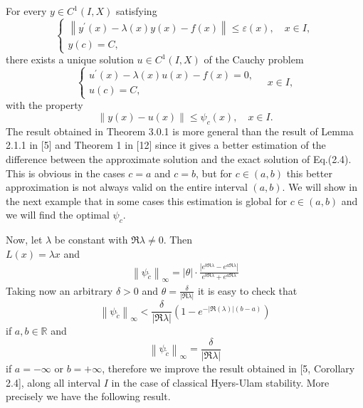 \documentclass[a4paper,12pt]{report}
\begin{document}
\begin{cor}
	 For every $y \in C^{1}(I, X)$ satisfying
	 $$ \left\{\begin{array}{l}
	 	\left\|y^{\prime}(x)-\lambda(x) y(x)-f(x)\right\| \le \varepsilon(x), \quad x \in I, \\
	 	y(c)=C,
	 \end{array}\right. $$
  there exists a unique solution $u \in C^{1}(I, X)$ of the Cauchy problem
 $$\left\{\begin{array}{l}
 	u^{\prime}(x)-\lambda(x) u(x)-f(x)=0, \\
 	u(c)=C,
 \end{array} \quad x \in I,\right.$$ with the property
 $$\|y(x)-u(x)\| \le \psi_{c}(x), \quad x \in I .$$
 The result obtained in Theorem 3.0.1 is more general than the result of Lemma 2.1.1 in [5] and Theorem 1 in [12] since it gives a better estimation of the difference between the approximate solution and the exact solution of Eq.(2.4). This is obvious in the cases $c=a$ and $c=b$, but for $c \in(a, b)$ this better approximation is not always valid on the entire interval $(a, b)$. We will show in the next example that in some cases this estimation is global for $c \in(a, b)$ and we will find the optimal $\psi_{c}$.
\end{cor}	
\begin{Rem}
	Now, let $\lambda$ be constant with $\Re \lambda \neq 0$. Then \\ $L(x)=\lambda x$ and
	\begin{eqnarray}
		\left\|\psi_{\tilde{c}}\right\|_{\infty}=|\theta| \cdot \frac{\left|e^{b \Re \lambda}-e^{a \Re \lambda}\right|}{e^{b \Re \lambda}+e^{a \Re \lambda}}
	\end{eqnarray}
Taking now an arbitrary $\delta>0$ and $\theta=\frac{\delta}{|\Re \lambda|}$ it is easy to check that
$$\left\|\psi_{\tilde{c}}\right\|_{\infty}<\frac{\delta}{|\Re \lambda|}\left(1-e^{-|\Re(\lambda)|(b-a)}\right)$$
if $a, b \in \mathbb{R}$ and 
$$\left\|\psi_{\tilde{c}}\right\|_{\infty}=\frac{\delta}{|\mathfrak{R} \lambda|}$$
if $a=-\infty$ or $b=+\infty$, therefore we improve the result obtained in [5, Corollary 2.4], along all interval $I$ in the case of classical Hyers-Ulam stability.
More precisely we have the following result.
\end{Rem}	
\end{document}
